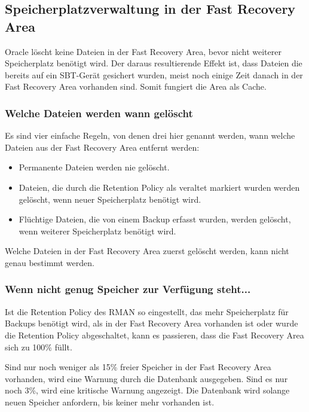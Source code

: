       \subsection{Speicherplatzverwaltung in der Fast Recovery Area}
        Oracle l\"oscht keine Dateien in der Fast Recovery Area, bevor nicht weiterer Speicherplatz ben\"otigt wird. Der daraus resultierende Effekt ist, dass Dateien die bereits auf ein SBT-Ger\"at gesichert wurden, meist noch einige Zeit danach in der Fast Recovery Area vorhanden sind. Somit fungiert die Area als Cache.
        \subsubsection{Welche Dateien werden wann gel\"oscht}
          Es sind vier einfache Regeln, von denen drei hier genannt werden, wann welche Dateien aus der Fast Recovery Area entfernt werden:
          \begin{itemize}
            \item Permanente Dateien werden nie gel\"oscht.
            \item Dateien, die durch die Retention Policy als veraltet markiert wurden werden ge\-l\"oscht, wenn neuer Speicherplatz ben\"otigt wird.
            \item Fl\"uchtige Dateien, die von einem Backup erfasst wurden, werden gel\"oscht, wenn weiterer Speicherplatz ben\"otigt wird.
          \end{itemize}
          \begin{merke}
            Welche Dateien in der Fast Recovery Area zuerst gel\"oscht werden, kann nicht genau bestimmt werden.
          \end{merke}
        \subsubsection{Wenn nicht genug Speicher zur Verf\"ugung steht...}
          Ist die Retention Policy des RMAN so eingestellt, das mehr Speicherplatz f\"ur Backups ben\"otigt wird, als in der Fast Recovery Area vorhanden ist oder wurde die Retention Policy abgeschaltet, kann es passieren, dass die Fast Recovery Area sich zu 100\% f\"ullt.

          Sind nur noch weniger als 15\% freier Speicher in der Fast Recovery Area vorhanden, wird eine Warnung durch die Datenbank ausgegeben. Sind es nur noch 3\%, wird eine kritische Warnung angezeigt. Die Datenbank wird solange neuen Speicher anfordern, bis keiner mehr vorhanden ist.

